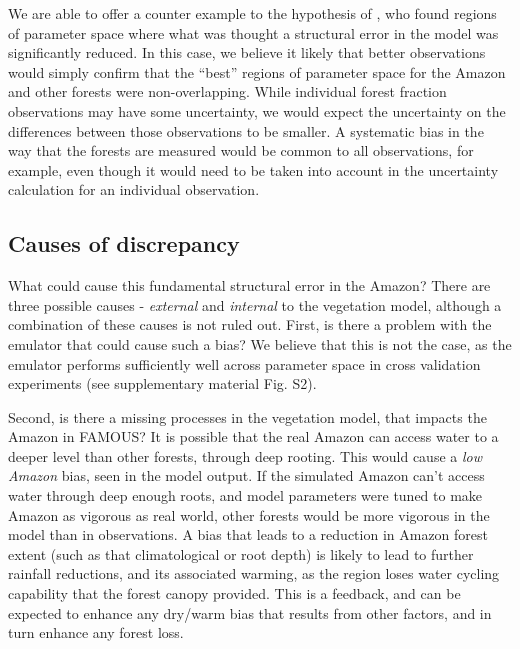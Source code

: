\documentclass[esd, article]{copernicus} %
\begin{document}
We are able to offer a counter example to the hypothesis of \cite{williamson2014identifying}, who found regions of parameter space where what was thought a structural error in the model was significantly reduced. In this case, we believe it likely that better observations would simply confirm that the ``best'' regions of parameter space for the Amazon and other forests were non-overlapping. While individual forest fraction observations may have some uncertainty, we would expect the uncertainty on the differences between those observations to be smaller. A systematic bias in the way that the forests are measured would be common to all observations, for example, even though it would need to be taken into account in the uncertainty calculation for an individual observation.

\subsection{Causes of discrepancy}\label{ssec:causes}
What could cause this fundamental structural error in the Amazon? There are three possible causes - \emph{external} and \emph{internal} to the vegetation model, although a combination of these causes is not ruled out. First, is there a problem with the emulator that could cause such a bias? We believe that this is not the case, as the emulator performs sufficiently well across parameter space in cross validation experiments (see supplementary material Fig. S2).

Second, is there a missing processes in the vegetation model, that impacts the Amazon in FAMOUS? It is possible that the real Amazon can access water to a deeper level than other forests, through deep rooting. This would cause a \emph{low Amazon} bias, seen in the model output. If the simulated Amazon can't access water through deep enough roots, and model parameters were tuned to make Amazon as vigorous as real world, other forests would be more vigorous in the model than in observations. A bias that leads to a reduction in Amazon forest extent (such as that climatological or root depth) is likely to lead to further rainfall reductions, and its associated warming, as the region loses water cycling capability that the forest canopy provided.  This is a feedback, and can be expected to enhance any dry/warm bias that results from other factors, and in turn enhance any forest loss.
\end{document}
